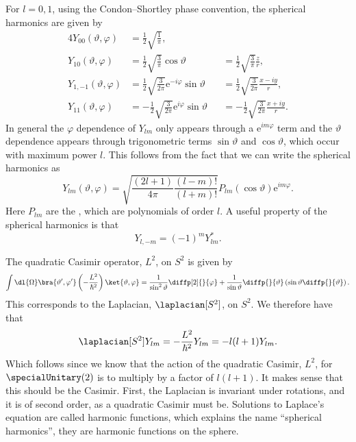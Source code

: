 \documentclass[fleqn]{NotesClass}
\newcommand*{\e}{\mathrm{e}}
\begin{document}
    For \(l = 0, 1\), using the Condon--Shortley phase convention, the spherical harmonics are given by
    \begin{alignat}{4}
        Y_{00}(\vartheta, \varphi) &= \frac{1}{2}\sqrt{\frac{1}{\pi}},\\
        Y_{10}(\vartheta, \varphi) &= \frac{1}{2}\sqrt{\frac{3}{\pi}} \cos\vartheta &&= \frac{1}{2}\sqrt{\frac{3}{\pi}} \frac{z}{r}, \label{eqn:Y10} \\
        Y_{1,{-1}}(\vartheta, \varphi) &= \frac{1}{2}\sqrt{\frac{3}{2\pi}}\e^{-i\varphi}\sin\vartheta &&= \frac{1}{2}\sqrt{\frac{3}{2\pi}} \frac{x - iy}{r},\\
        Y_{11}(\vartheta, \varphi) &= -\frac{1}{2}\sqrt{\frac{3}{2\pi}}\e^{i\varphi}\sin\vartheta &&= -\frac{1}{2}\sqrt{\frac{3}{2\pi}} \frac{x + iy}{r}.
    \end{alignat}
    In general the \(\varphi\) dependence of \(Y_{lm}\) only appears through a \(\e^{im\varphi}\) term and the \(\vartheta\) dependence appears through trigonometric terms \(\sin\vartheta\) and \(\cos\vartheta\), which occur with maximum power \(l\).
    This follows from the fact that we can write the spherical harmonics as
    \begin{equation}
        Y_{lm}(\vartheta, \varphi) = \sqrt{\frac{(2l + 1)}{4\pi}\frac{(l - m)!}{(l + m)!}} P_{lm}(\cos\vartheta)\e^{im\varphi}.
    \end{equation}
    Here \(P_{lm}\) are the , which are polynomials of order \(l\).
    A useful property of the spherical harmonics is that
    \begin{equation}
        Y_{l,{-m}} = (-1)^mY_{lm}^*.
    \end{equation}
    
    The quadratic Casimir operator, \(L^2\), on \(S^2\) is given by
    \begin{equation}
        \int \dl{\Omega} \bra{\vartheta', \varphi'} \left( -\frac{L^2}{\hbar^2} \right) \ket{\vartheta, \varphi} = \frac{1}{\sin^2\vartheta}\diffp[2]{}{\varphi} + \frac{1}{\sin \vartheta} \diffp{}{\vartheta}\left( \sin\vartheta \diffp{}{\vartheta} \right).
    \end{equation}
    This corresponds to the Laplacian, \(\laplacian[S^2]\), on \(S^2\).
    We therefore have that
    \begin{equation}
        \laplacian[S^2]Y_{lm} = -\frac{L^2}{\hbar^2}Y_{lm} = -l(l + 1)Y_{lm}.
    \end{equation}
    Which follows since we know that the action of the quadratic Casimir, \(L^2\), for \(\specialUnitary(2)\) is to multiply by a factor of \(l(l + 1)\).
    It makes sense that this should be the Casimir.
    First, the Laplacian is invariant under rotations, and it is of second order, as a quadratic Casimir must be.
    Solutions to Laplace's equation are called harmonic functions, which explains the name \enquote{spherical harmonics}, they are harmonic functions on the sphere.
    
\end{document}

